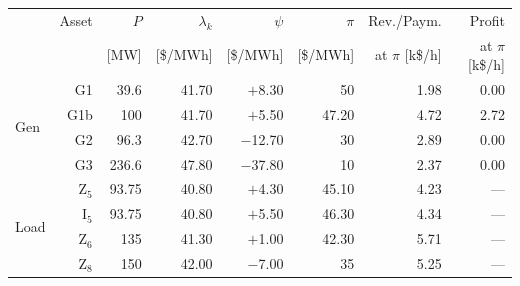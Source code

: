 \begin{table}[!tb]
\centering
\label{tab:colocated_bus1_9bus}
\footnotesize
\setlength{\tabcolsep}{2pt}
\newcommand{\rowhl}[1]{\cellcolor{gray!25}#1}
\begin{tabular}{lrrrrrrr}
\toprule
 & Asset & $P$ & $\lambda_k$ & $\psi$ & $\pi$ & Rev./Paym. & Profit \\
 &  & [MW] & [\$/MWh] & [\$/MWh] & [\$/MWh] & at $\pi$ [k\$/h] & at $\pi$ [k\$/h] \\
\midrule
\multirow{4}{*}{Gen} & \rowhl{G1} & \rowhl{39.6} & \rowhl{41.70} & \rowhl{$+$8.30} & \rowhl{50} & \rowhl{1.98} & \rowhl{0.00} \\
 & \rowhl{G1b} & \rowhl{100} & \rowhl{41.70} & \rowhl{$+$5.50} & \rowhl{47.20} & \rowhl{4.72} & \rowhl{2.72} \\
 & G2 & 96.3 & 42.70 & $-$12.70 & 30 & 2.89 & 0.00 \\
 & G3 & 236.6 & 47.80 & $-$37.80 & 10 & 2.37 & 0.00 \\
\midrule
\multirow{4}{*}{Load} & \rowhl{Z$_5$} & \rowhl{93.75} & \rowhl{40.80} & \rowhl{$+$4.30} & \rowhl{45.10} & \rowhl{4.23} & \rowhl{---} \\
 & \rowhl{I$_5$} & \rowhl{93.75} & \rowhl{40.80} & \rowhl{$+$5.50} & \rowhl{46.30} & \rowhl{4.34} & \rowhl{---} \\
 & Z$_6$ & 135 & 41.30 & $+$1.00 & 42.30 & 5.71 & --- \\
 & Z$_8$ & 150 & 42.00 & $-$7.00 & 35 & 5.25 & --- \\
\bottomrule
\end{tabular}
\end{table}
